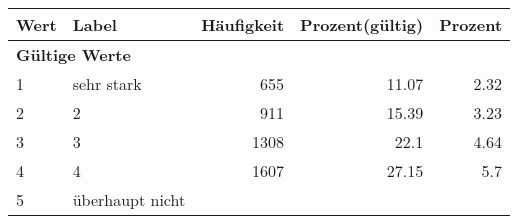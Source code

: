      \begin{longtable}{lXrrr}
     \toprule
     \textbf{Wert} & \textbf{Label} & \textbf{Häufigkeit} & \textbf{Prozent(gültig)} & \textbf{Prozent} \\
     \endhead
     \midrule
     \multicolumn{5}{l}{\textbf{Gültige Werte}}\\

     1 &
     \multicolumn{1}{X}{ sehr stark   } &


       \num{655} &
       \num[round-mode=places,round-precision=2]{11,07} &
         \num[round-mode=places,round-precision=2]{2,32} \\

     2 &
     \multicolumn{1}{X}{ 2   } &


       \num{911} &
       \num[round-mode=places,round-precision=2]{15,39} &
         \num[round-mode=places,round-precision=2]{3,23} \\

     3 &
     \multicolumn{1}{X}{ 3   } &


       \num{1308} &
       \num[round-mode=places,round-precision=2]{22,1} &
         \num[round-mode=places,round-precision=2]{4,64} \\

     4 &
     \multicolumn{1}{X}{ 4   } &


       \num{1607} &
       \num[round-mode=places,round-precision=2]{27,15} &
         \num[round-mode=places,round-precision=2]{5,7} \\

     5 &
     \multicolumn{1}{X}{ überhaupt nicht   } &



\end{longtable}
